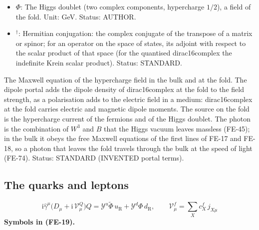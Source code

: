 \documentclass[
  10pt,
]{article}
\begin{document}
\begin{itemize}
  fields of the fold the gauge and spin covariant derivative \(D_\mu\)
  (the partial derivative plus the spin connection of the fold and the
  gauge fields times their couplings and generators);
  \(D^\mu = \hat h^{\mu\nu}D_\nu\); on an adjoint field
  \((D_\mu X)^A = \partial_\mu X^A + g_3f^{ABC}G^B_\mu X^C\) (likewise
  for \(SU(2)\) with \(g_2\epsilon^{IJK}\)). Unit: 1/length. Status:
  STANDARD.
\item
  \(\Phi\): The Higgs doublet (two complex components, hypercharge
  \(1/2\)), a field of the fold. Unit: GeV. Status: AUTHOR.
\item
  \({}^\dagger\): Hermitian conjugation: the complex conjugate of the
  transpose of a matrix or spinor; for an operator on the space of
  states, its adjoint with respect to the scalar product of that space
  (for the quantised dirac16complex the indefinite Krein scalar
  product). Status: STANDARD.
\end{itemize}

The Maxwell equation of the hypercharge field in the bulk and at the
fold. The dipole portal adds the dipole density of dirac16complex at the
fold to the field strength, as a polarisation adds to the electric field
in a medium: dirac16complex at the fold carries electric and magnetic
dipole moments. The source on the fold is the hypercharge current of the
fermions and of the Higgs doublet. The photon is the combination of
\(W^3\) and \(B\) that the Higgs vacuum leaves massless (FE-45); in the
bulk it obeys the free Maxwell equations of the first lines of FE-17 and
FE-18, so a photon that leaves the fold travels through the bulk at the
speed of light (FE-74). Status: STANDARD (INVENTED portal terms).

\hypertarget{the-quarks-and-leptons-1}{%
\subsection{The quarks and leptons}\label{the-quarks-and-leptons-1}}

\[
\mathrm{i}\hat\gamma^\mu\big(D_\mu + \mathrm{i}\,\mathcal{V}^{Q}_\mu\big)Q = \mathcal{Y}^{u}\tilde\Phi\,u_{\mathrm{R}}
 + \mathcal{Y}^{d}\Phi\,d_{\mathrm{R}},\qquad \mathcal{V}^{f}_\mu = \sum_X c^{f}_X\,j_{X\mu} \tag{FE-19}
\] \textbf{Symbols in (FE-19).}
\end{document}
